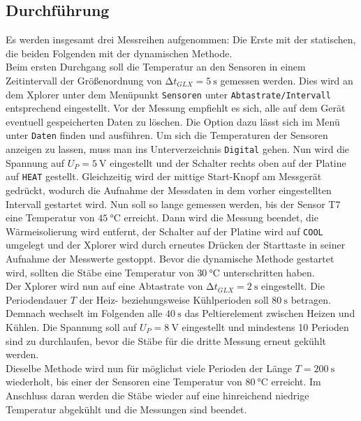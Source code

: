 \subsection{Durchführung}
Es werden insgesamt drei Messreihen aufgenommen: Die Erste mit der statischen, die beiden Folgenden 
mit der dynamischen Methode.\\
Beim ersten Durchgang soll die Temperatur an den Sensoren in einem Zeitintervall der Größenordnung von 
$\increment t_{GLX} = \SI{5}{\second}$ gemessen werden. 
Dies wird an dem Xplorer unter dem Menüpunkt \texttt{Sensoren} unter \texttt{Abtastrate/Intervall} entsprechend eingestellt.
Vor der Messung empfiehlt es sich, alle auf dem Gerät eventuell gespeicherten Daten zu löschen. 
Die Option dazu lässt sich im Menü unter \texttt{Daten} finden und ausführen. 
Um sich die Temperaturen der Sensoren anzeigen zu lassen, muss man ins Unterverzeichnis \texttt{Digital} gehen.
Nun wird die Spannung auf $U_P = \SI{5}{\volt}$ eingestellt und der Schalter rechts oben auf der Platine 
auf \texttt{HEAT} gestellt. 
Gleichzeitig wird der mittige Start-Knopf am Messgerät gedrückt, wodurch die Aufnahme der Messdaten in dem vorher
eingestellten Intervall gestartet wird. 
Nun soll so lange gemessen werden, bis der Sensor T7 eine Temperatur von $\SI{45}{\celsius}$ erreicht. 
Dann wird die Messung beendet, die Wärmeisolierung wird entfernt, der Schalter auf der Platine wird auf \texttt{COOL} 
umgelegt und der Xplorer wird durch erneutes Drücken der Starttaste in seiner Aufnahme der Messwerte gestoppt. 
Bevor die dynamische Methode gestartet wird, sollten die Stäbe eine Temperatur von $\SI{30}{\celsius}$  
unterschritten haben. \\
Der Xplorer wird nun auf eine Abtastrate von $\increment t_{GLX} = \SI{2}{\second}$ eingestellt. 
Die Periodendauer $T$ der Heiz- beziehungsweise Kühlperioden soll $\SI{80}{\second}$ betragen. 
Demnach wechselt im Folgenden alle $\SI{40}{\second}$ das Peltierelement zwischen Heizen und Kühlen.
Die Spannung soll auf $U_P = \SI{8}{\volt}$ eingestellt und mindestens 10 Perioden sind zu durchlaufen, bevor die Stäbe 
für die dritte Messung erneut gekühlt werden. \\
Dieselbe Methode wird nun für möglichst viele Perioden der Länge $T = \SI{200}{\second}$ wiederholt, bis einer der Sensoren 
eine Temperatur von $\SI{80}{\celsius}$ erreicht. 
Im Anschluss daran werden die Stäbe wieder auf eine hinreichend niedrige Temperatur abgekühlt und die Messungen sind beendet.

